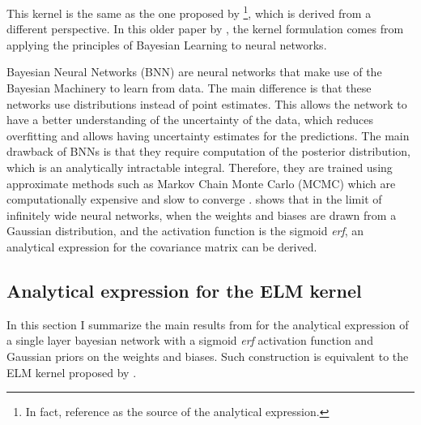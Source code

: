 This kernel is the same as the one proposed by \textcite{williamsComputationInfiniteNeural1998}\footnote{
    In fact, \textcite{frenayParameterinsensitiveKernelExtreme2011} reference \textcite{williamsComputationInfiniteNeural1998} as the source of the analytical
expression.}, which is derived from a different perspective.
In this older paper by \citeauthor{williamsComputationInfiniteNeural1998}, the kernel formulation comes from
applying the principles of Bayesian Learning to neural networks\cite{nealBayesianLearningNeural1996,bishopBayesianNeuralNetworks1997}.

Bayesian Neural Networks (BNN) are neural networks that make use of the Bayesian Machinery to learn
from data. The main difference is that these networks use distributions instead of point estimates\cite{nealBayesianLearningNeural1996}.
This allows the network to have a better understanding of the uncertainty of the data, which reduces
overfitting and allows having uncertainty estimates for the predictions. The main drawback of BNNs
is that they require computation of the posterior distribution, which is an analytically intractable
integral. Therefore, they are trained using approximate methods such as Markov Chain Monte Carlo (MCMC) which
are computationally expensive and slow to converge \cite{nealBayesianTrainingBackpropagation1992}. \Textcite{williamsComputationInfiniteNeural1998}
shows that in the limit of infinitely wide neural networks, when the weights and biases are drawn from
a Gaussian distribution, and the activation function is the sigmoid \emph{erf}, an analytical expression
for the covariance matrix can be derived.

\subsection{Analytical expression for the ELM kernel}

In this section I summarize the main results from \textcite{williamsComputationInfiniteNeural1998} for the
analytical expression of a single layer bayesian network with a sigmoid \emph{erf} activation function and
Gaussian priors on the weights and biases. Such construction is equivalent to the ELM kernel proposed by
\textcite{frenayParameterinsensitiveKernelExtreme2011}.

